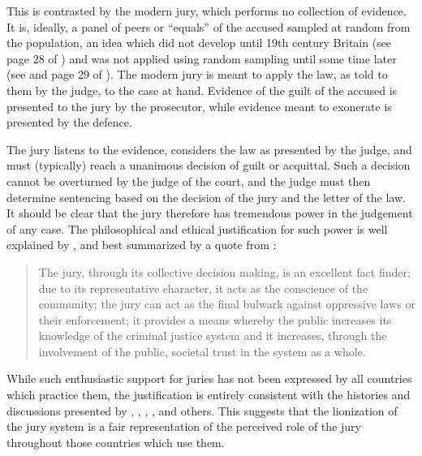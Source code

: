 This is contrasted by the modern jury, which performs no collection of evidence. It is, ideally, a panel of peers or ``equals'' of
the accused sampled at random from the population, an idea which did not develop until 19th century Britain (see page 28 of
\cite{hansvidjudging}) and was not applied using random sampling until some time later (see \cite{hoffman1997} and page 29 of
\cite{hansvidjudging}). The modern jury is meant to apply the law, as told to them by the judge\footnotemark, to the case at
hand. Evidence of the guilt of the accused is presented to the jury by the prosecutor, while evidence meant to exonerate is
presented by the defence.

The jury listens to the evidence, considers the law as presented by the judge, and must (typically) reach a unanimous
decision of guilt or acquittal. Such a decision cannot be overturned by the judge of the court, and the judge must then determine
sentencing based on the decision of the jury and the letter of the law\footnotemark[\value{footnote}]. It should be clear that the
jury therefore has tremendous power in the judgement of any case. The philosophical and ethical justification for such power is
well explained by \cite{woolley2018}, and best summarized by a quote from \cite{rvsherratt}:


\begin{quote}
  \centering
  The jury, through its collective decision making, is an excellent fact finder; due to its representative character, it acts as
  the conscience of the community; the jury can act as the final bulwark against oppressive laws or their enforcement; it provides
  a means whereby the public increases its knowledge of the criminal justice system and it increases, through the involvement of
  the public, societal trust in the system as a whole.
\end{quote}

While such enthusiastic support for juries has not been expressed by all countries which practice them, the justification is
entirely consistent with the histories and discussions presented by \cite{hoffman1997}, \cite{vonmosch1921}, \cite{hansvidjudging},
\cite{vandykejurysel}, and others. This suggests that the \cite{rvsherratt} lionization of the jury system is a fair
representation of the perceived role of the jury throughout those countries which use them.

